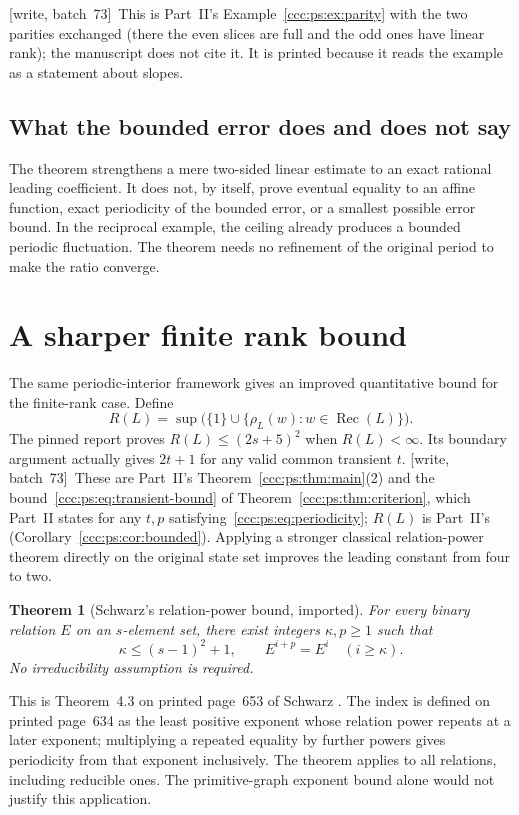 \documentclass[11pt,letterpaper]{article}
\newtheorem{theorem}{Theorem}[section]
\theoremstyle{definition}
\theoremstyle{remark}
\newcommand{\rec}{\operatorname{Rec}}
\newcommand{\rank}{\rho}
\newcommand{\wsevthree}{\textup{[write, batch~73]}}
\begin{document}
\wsevthree\ This is Part~II's Example~\ref{ccc:ps:ex:parity} with the two
parities exchanged (there the even slices are full and the odd ones have
linear rank); the manuscript does not cite it. It is printed because it reads
the example as a statement about slopes.

\subsection{What the bounded error does and does not say}
The theorem strengthens a mere two-sided linear estimate to an exact rational leading coefficient. It does not, by itself, prove eventual equality to an affine function, exact periodicity of the bounded error, or a smallest possible error bound. In the reciprocal example, the ceiling already produces a bounded periodic fluctuation. The theorem needs no refinement of the original period to make the ratio converge.


\section{A sharper finite rank bound}\label{ccc:rs:sec:upper}

The same periodic-interior framework gives an improved quantitative bound for the finite-rank case. Define
\[
R(L)=\sup\bigl(\{1\}\cup\{\rank_L(w):w\in\rec(L)\}\bigr).
\]
The pinned report proves $R(L)\le(2s+5)^2$ when $R(L)<\infty$. Its boundary argument actually gives $2t+1$ for any valid common transient $t$.
\wsevthree\ These are Part~II's Theorem~\ref{ccc:ps:thm:main}(2) and the
bound~\eqref{ccc:ps:eq:transient-bound} of Theorem~\ref{ccc:ps:thm:criterion},
which Part~II states for any $t,p$ satisfying~\eqref{ccc:ps:eq:periodicity};
$R(L)$ is Part~II's (Corollary~\ref{ccc:ps:cor:bounded}). Applying a stronger classical relation-power theorem directly on the original state set improves the leading constant from four to two.

\begin{theorem}[Schwarz's relation-power bound, imported]\label{ccc:rs:thm:schwarz}
For every binary relation $E$ on an $s$-element set, there exist integers $\kappa,p\ge1$ such that
\[
\kappa\le(s-1)^2+1,\qquad E^{i+p}=E^i\quad(i\ge\kappa).
\]
No irreducibility assumption is required.
\end{theorem}

This is Theorem~4.3 on printed page~653 of Schwarz \cite{Schwarz}. The index is defined on printed page~634 as the least positive exponent whose relation power repeats at a later exponent; multiplying a repeated equality by further powers gives periodicity from that exponent inclusively. The theorem applies to all relations, including reducible ones. The primitive-graph exponent bound alone would not justify this application.
\end{document}
